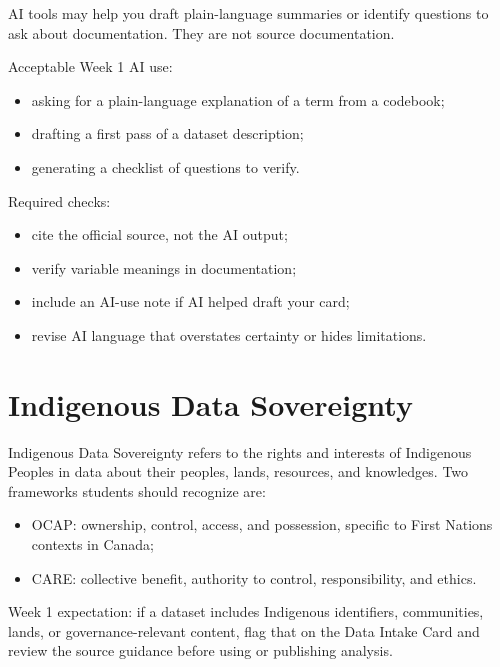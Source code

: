 \documentclass[
  letterpaper,
  DIV=11,
  numbers=noendperiod,
  oneside]{scrreprt}
\providecommand{\tightlist}{%
  \setlength{\itemsep}{0pt}\setlength{\parskip}{0pt}}
\begin{document}

AI tools may help you draft plain-language summaries or identify
questions to ask about documentation. They are not source documentation.

Acceptable Week 1 AI use:

\begin{itemize}
\tightlist
\item
  asking for a plain-language explanation of a term from a codebook;
\item
  drafting a first pass of a dataset description;
\item
  generating a checklist of questions to verify.
\end{itemize}

Required checks:

\begin{itemize}
\tightlist
\item
  cite the official source, not the AI output;
\item
  verify variable meanings in documentation;
\item
  include an AI-use note if AI helped draft your card;
\item
  revise AI language that overstates certainty or hides limitations.
\end{itemize}

\section*{Indigenous Data
Sovereignty}\label{indigenous-data-sovereignty}


Indigenous Data Sovereignty refers to the rights and interests of
Indigenous Peoples in data about their peoples, lands, resources, and
knowledges. Two frameworks students should recognize are:

\begin{itemize}
\tightlist
\item
  OCAP: ownership, control, access, and possession, specific to First
  Nations contexts in Canada;
\item
  CARE: collective benefit, authority to control, responsibility, and
  ethics.
\end{itemize}

Week 1 expectation: if a dataset includes Indigenous identifiers,
communities, lands, or governance-relevant content, flag that on the
Data Intake Card and review the source guidance before using or
publishing analysis.
\end{document}
